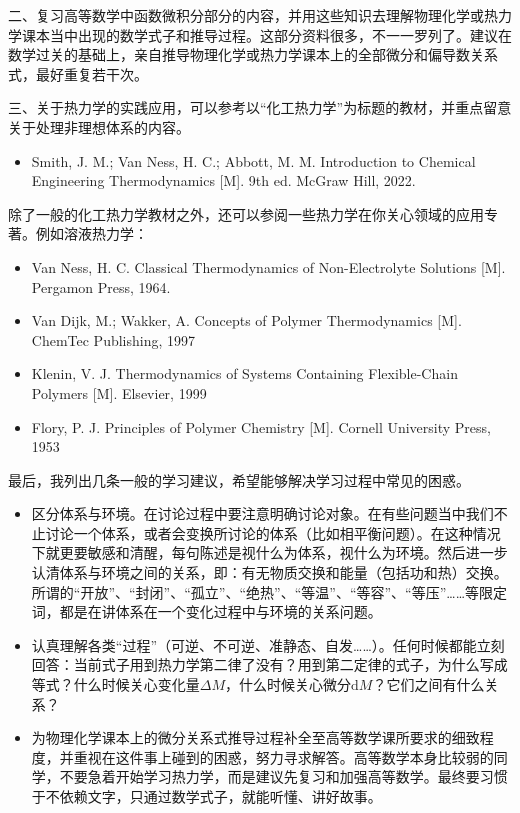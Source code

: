 \documentclass[main.tex]{subfiles}
\begin{document}
二、复习高等数学中函数微积分部分的内容，并用这些知识去理解物理化学或热力学课本当中出现的数学式子和推导过程。这部分资料很多，不一一罗列了。建议在数学过关的基础上，亲自推导物理化学或热力学课本上的全部微分和偏导数关系式，最好重复若干次。

三、关于热力学的实践应用，可以参考以“化工热力学”为标题的教材，并重点留意关于处理非理想体系的内容。
\begin{itemize}
    \item Smith, J. M.; Van Ness, H. C.; Abbott, M. M. Introduction to Chemical Engineering Thermodynamics [M]. 9th ed. McGraw Hill, 2022.
\end{itemize}
除了一般的化工热力学教材之外，还可以参阅一些热力学在你关心领域的应用专著。例如溶液热力学：
\begin{itemize}
    \item Van Ness, H. C. Classical Thermodynamics of Non-Electrolyte Solutions [M]. Pergamon Press, 1964.
    \item Van Dijk, M.; Wakker, A. Concepts of Polymer Thermodynamics [M]. ChemTec Publishing, 1997
    \item Klenin, V. J. Thermodynamics of Systems Containing Flexible-Chain Polymers [M]. Elsevier, 1999
    \item Flory, P. J. Principles of Polymer Chemistry [M]. Cornell University Press, 1953
\end{itemize}

最后，我列出几条一般的学习建议，希望能够解决学习过程中常见的困惑。
\begin{itemize}
    \item 区分体系与环境。在讨论过程中要注意明确讨论对象。在有些问题当中我们不止讨论一个体系，或者会变换所讨论的体系（比如相平衡问题）。在这种情况下就更要敏感和清醒，每句陈述是视什么为体系，视什么为环境。然后进一步认清体系与环境之间的关系，即：有无物质交换和能量（包括功和热）交换。所谓的“开放”、“封闭”、“孤立”、“绝热”、“等温”、“等容”、“等压”……等限定词，都是在讲体系在一个变化过程中与环境的关系问题。
    \item 认真理解各类“过程”（可逆、不可逆、准静态、自发……）。任何时候都能立刻回答：当前式子用到热力学第二律了没有？用到第二定律的式子，为什么写成等式？什么时候关心变化量$\Delta M$，什么时候关心微分$\mathrm{d}M$？它们之间有什么关系？
    \item 为物理化学课本上的微分关系式推导过程补全至高等数学课所要求的细致程度，并重视在这件事上碰到的困惑，努力寻求解答。高等数学本身比较弱的同学，不要急着开始学习热力学，而是建议先复习和加强高等数学。最终要习惯于不依赖文字，只通过数学式子，就能听懂、讲好故事。
\end{itemize}
\end{document}
